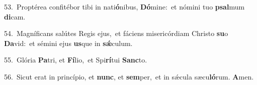 {\numbfont\textcolor{\numbcolor}{53.}}~Proptérea confitébor tibi in nati\-\textbf{ó}\-nibus, \textbf{Dó}\-mine:~\star et nómini tuo \textbf{psal}\-mum \textbf{di}\-cam.\par
{\numbfont\textcolor{\numbcolor}{54.}}~Magníficans salútes Regis ejus,~\dagger et fáciens misericórdiam Christo \textbf{su}\-o \textbf{Da}\-vid:~\star et sémini ejus \textbf{us}\-que in \textbf{sǽ}\-culum.\par
{\numbfont\textcolor{\numbcolor}{55.}}~Glória \textbf{Pa}\-tri, et \textbf{Fí}\-lio,~\star et Spi\-\textbf{rí}\-tui \textbf{Sanc}\-to.\par
{\numbfont\textcolor{\numbcolor}{56.}}~Sicut erat in princípio, et \textbf{nunc}\-, et \textbf{sem}\-per,~\star et in sǽcula sæcu\-\textbf{ló}\-rum. \textbf{A}\-men.\par
